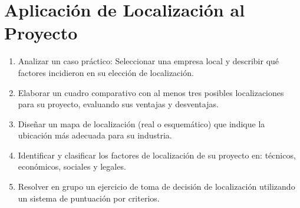 \documentclass[../main]{subfiles}
\begin{document}
\chapter{Aplicación de Localización al Proyecto}
\begin{enumerate}
  \item Analizar un caso práctico: Seleccionar una empresa local y
    describir qué factores incidieron en su elección de localización.
  \item Elaborar un cuadro comparativo con al menos tres posibles
    localizaciones para su proyecto, evaluando sus
    ventajas y desventajas.
  \item Diseñar un mapa de localización (real o esquemático) que
    indique la ubicación más adecuada para su industria.
  \item Identificar y clasificar los factores de localización de su proyecto en:
    técnicos, económicos, sociales y legales.
  \item Resolver en grupo un ejercicio de toma de decisión de
    localización utilizando un sistema de puntuación por criterios.
\end{enumerate}
\end{document}
